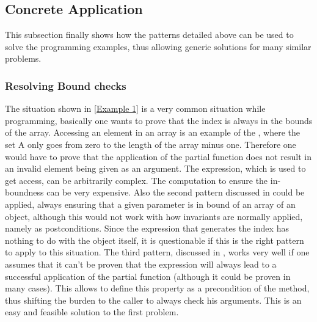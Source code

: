\subsection{Concrete Application}
This subsection finally shows how the patterns detailed above can be used to solve the programming examples, thus allowing generic solutions for many similar problems.
\subsubsection{Resolving Bound checks}
The situation shown in \ref{Example 1} is a very common situation while programming, basically one wants to prove that the index is always in the bounds of the array. Accessing an element in an array is an example of the , where the set A only goes from zero to the length of the array minus one. Therefore one would have to prove that the application of the partial function does not result in an invalid element being given as an argument. The expression, which is used to get access, can be arbitrarily complex. The computation to ensure the in-boundness can be very expensive.  \newline
Also the second pattern discussed in  could be applied, always ensuring that a given parameter is in bound of an array of an object, although this would not work with how invariants are normally applied, namely as postconditions. Since the expression that generates the index has nothing to do with the object itself, it is questionable if this is the right pattern to apply to this situation. \newline
The third pattern, discussed in , works very well if one assumes that it can't be proven that the expression will always lead to a successful application of the partial function (although it could be proven in many cases). This allows to define this property as a precondition of the method, thus shifting the burden to the caller to always check his arguments. This is an easy and feasible solution to the first problem. 
